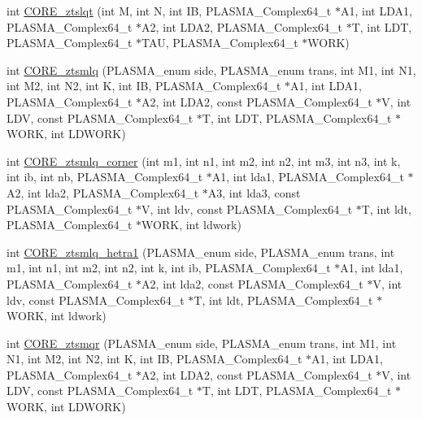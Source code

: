 \begin{DoxyCompactItemize}
\item 
int \hyperlink{group__CORE__PLASMA__Complex64__t_gaa15d1af5b8d83e6fc2055998b86d21ea_gaa15d1af5b8d83e6fc2055998b86d21ea}{C\+O\+R\+E\+\_\+ztslqt} (int M, int N, int I\+B, P\+L\+A\+S\+M\+A\+\_\+\+Complex64\+\_\+t $\ast$A1, int L\+D\+A1, P\+L\+A\+S\+M\+A\+\_\+\+Complex64\+\_\+t $\ast$A2, int L\+D\+A2, P\+L\+A\+S\+M\+A\+\_\+\+Complex64\+\_\+t $\ast$T, int L\+D\+T, P\+L\+A\+S\+M\+A\+\_\+\+Complex64\+\_\+t $\ast$T\+A\+U, P\+L\+A\+S\+M\+A\+\_\+\+Complex64\+\_\+t $\ast$W\+O\+R\+K)
\item 
int \hyperlink{group__CORE__PLASMA__Complex64__t_ga0034cb17f405c2206da5b7279e9945d5_ga0034cb17f405c2206da5b7279e9945d5}{C\+O\+R\+E\+\_\+ztsmlq} (P\+L\+A\+S\+M\+A\+\_\+enum side, P\+L\+A\+S\+M\+A\+\_\+enum trans, int M1, int N1, int M2, int N2, int K, int I\+B, P\+L\+A\+S\+M\+A\+\_\+\+Complex64\+\_\+t $\ast$A1, int L\+D\+A1, P\+L\+A\+S\+M\+A\+\_\+\+Complex64\+\_\+t $\ast$A2, int L\+D\+A2, const P\+L\+A\+S\+M\+A\+\_\+\+Complex64\+\_\+t $\ast$V, int L\+D\+V, const P\+L\+A\+S\+M\+A\+\_\+\+Complex64\+\_\+t $\ast$T, int L\+D\+T, P\+L\+A\+S\+M\+A\+\_\+\+Complex64\+\_\+t $\ast$W\+O\+R\+K, int L\+D\+W\+O\+R\+K)
\item 
int \hyperlink{group__CORE__PLASMA__Complex64__t_gaa9752183fdb0ccb590cfa9be110d7863_gaa9752183fdb0ccb590cfa9be110d7863}{C\+O\+R\+E\+\_\+ztsmlq\+\_\+corner} (int m1, int n1, int m2, int n2, int m3, int n3, int k, int ib, int nb, P\+L\+A\+S\+M\+A\+\_\+\+Complex64\+\_\+t $\ast$A1, int lda1, P\+L\+A\+S\+M\+A\+\_\+\+Complex64\+\_\+t $\ast$A2, int lda2, P\+L\+A\+S\+M\+A\+\_\+\+Complex64\+\_\+t $\ast$A3, int lda3, const P\+L\+A\+S\+M\+A\+\_\+\+Complex64\+\_\+t $\ast$V, int ldv, const P\+L\+A\+S\+M\+A\+\_\+\+Complex64\+\_\+t $\ast$T, int ldt, P\+L\+A\+S\+M\+A\+\_\+\+Complex64\+\_\+t $\ast$W\+O\+R\+K, int ldwork)
\item 
int \hyperlink{group__CORE__PLASMA__Complex64__t_ga5282927ad0f8d26b7b6dc9d85c9e5048_ga5282927ad0f8d26b7b6dc9d85c9e5048}{C\+O\+R\+E\+\_\+ztsmlq\+\_\+hetra1} (P\+L\+A\+S\+M\+A\+\_\+enum side, P\+L\+A\+S\+M\+A\+\_\+enum trans, int m1, int n1, int m2, int n2, int k, int ib, P\+L\+A\+S\+M\+A\+\_\+\+Complex64\+\_\+t $\ast$A1, int lda1, P\+L\+A\+S\+M\+A\+\_\+\+Complex64\+\_\+t $\ast$A2, int lda2, const P\+L\+A\+S\+M\+A\+\_\+\+Complex64\+\_\+t $\ast$V, int ldv, const P\+L\+A\+S\+M\+A\+\_\+\+Complex64\+\_\+t $\ast$T, int ldt, P\+L\+A\+S\+M\+A\+\_\+\+Complex64\+\_\+t $\ast$W\+O\+R\+K, int ldwork)
\item 
int \hyperlink{group__CORE__PLASMA__Complex64__t_ga49f0eaa248fd87561e3d8b0ff236053f_ga49f0eaa248fd87561e3d8b0ff236053f}{C\+O\+R\+E\+\_\+ztsmqr} (P\+L\+A\+S\+M\+A\+\_\+enum side, P\+L\+A\+S\+M\+A\+\_\+enum trans, int M1, int N1, int M2, int N2, int K, int I\+B, P\+L\+A\+S\+M\+A\+\_\+\+Complex64\+\_\+t $\ast$A1, int L\+D\+A1, P\+L\+A\+S\+M\+A\+\_\+\+Complex64\+\_\+t $\ast$A2, int L\+D\+A2, const P\+L\+A\+S\+M\+A\+\_\+\+Complex64\+\_\+t $\ast$V, int L\+D\+V, const P\+L\+A\+S\+M\+A\+\_\+\+Complex64\+\_\+t $\ast$T, int L\+D\+T, P\+L\+A\+S\+M\+A\+\_\+\+Complex64\+\_\+t $\ast$W\+O\+R\+K, int L\+D\+W\+O\+R\+K)

\end{DoxyCompactItemize}
